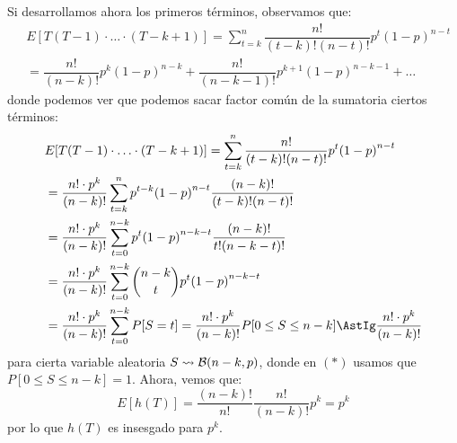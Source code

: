 \begin{ejercicio}
\begin{enumerate}
            Si desarrollamos ahora los primeros términos, observamos que:
            \begin{align*}
                &E[T(T-1)\cdot \ldots\cdot (T-k+1)] = \sum_{t=k}^{n}\dfrac{n!}{(t-k)!(n-t)!}p^t {(1-p)}^{n-t} \\
               &= \dfrac{n!}{(n-k)!}p^k {(1-p)}^{n-k} + \dfrac{n!}{(n-k-1)!}p^{k+1}{(1-p)}^{n-k-1} + \ldots
            \end{align*}
            donde podemos ver que podemos sacar factor común de la sumatoria ciertos términos:
            \begin{align*}
                &E[T(T-1)\cdot \ldots\cdot (T-k+1)] = \sum_{t=k}^{n}\dfrac{n!}{(t-k)!(n-t)!}p^t {(1-p)}^{n-t} \\
               &= \dfrac{n!\cdot p^k }{(n-k)!}\sum_{t=k}^{n}p^{t-k}{(1-p)}^{n-t}\dfrac{(n-k)!}{(t-k)!(n-t)!} \\
               &= \dfrac{n!\cdot p^k}{(n-k)!}\sum_{t=0}^{n-k} p^t {(1-p)}^{n-k-t}\dfrac{(n-k)!}{t!(n-k-t)!} \\
               &= \dfrac{n!\cdot p^k}{(n-k)!}\sum_{t=0}^{n-k}\binom{n-k}{t} p^t {(1-p)}^{n-k-t} \\
               &= \dfrac{n!\cdot p^k}{(n-k)!}\sum_{t=0}^{n-k}P[S=t] = \dfrac{n!\cdot p^k}{(n-k)!}P[0\leq S \leq n-k] \AstIg \dfrac{n!\cdot p^k}{(n-k)!}
            \end{align*}
            para cierta variable aleatoria $S\rightsquigarrow \mathcal{B}(n-k,p)$, donde en $(\ast)$ usamos que $P[0\leq S \leq n-k]=1$. Ahora, vemos que:
            \begin{equation*}
                E[h(T)] = \dfrac{(n-k)!}{n!}\dfrac{n!}{(n-k)!}p^k = p^k
            \end{equation*}
            por lo que $h(T)$ es insesgado para $p^k$.\\


\end{enumerate}
\end{ejercicio}
